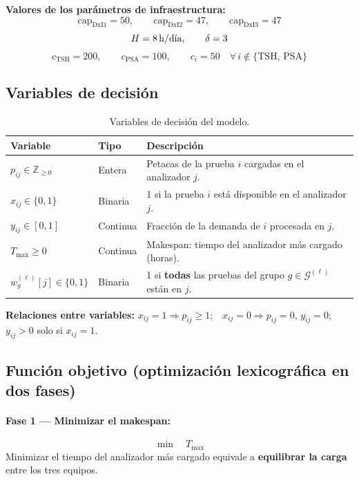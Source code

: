 \documentclass[12pt, a4paper]{article}
\begin{document}
\textbf{Valores de los parámetros de infraestructura:}
\[
  \text{cap}_{\text{DxI1}} = 50, \qquad
  \text{cap}_{\text{DxI2}} = 47, \qquad
  \text{cap}_{\text{DxI3}} = 47
\]
\[
  H = 8\text{\,h/día}, \qquad \delta = 3
\]
\[
  c_{\text{TSH}} = 200, \qquad c_{\text{PSA}} = 100, \qquad
  c_i = 50 \quad \forall\, i \notin \{\text{TSH},\,\text{PSA}\}
\]

\subsection{Variables de decisión}

\begin{table}[H]
\centering
\caption{Variables de decisión del modelo.}
\begin{tabularx}{\linewidth}{llX}
\toprule
\textbf{Variable} & \textbf{Tipo} & \textbf{Descripción} \\
\midrule
$p_{ij} \in \mathbb{Z}_{\geq 0}$ & Entera & Petacas de la prueba $i$ cargadas en el analizador $j$. \\
$x_{ij} \in \{0,1\}$ & Binaria & 1 si la prueba $i$ está disponible en el analizador $j$. \\
$y_{ij} \in [0,1]$ & Continua & Fracción de la demanda de $i$ procesada en $j$. \\
$T_{\max} \geq 0$ & Continua & Makespan: tiempo del analizador más cargado (horas). \\
$w_g^{(\ell)}[j] \in \{0,1\}$ & Binaria & 1 si \textbf{todas} las pruebas del grupo $g \in \mathcal{G}^{(\ell)}$ están en $j$. \\
\bottomrule
\end{tabularx}
\end{table}

\textbf{Relaciones entre variables:}
$x_{ij} = 1 \Rightarrow p_{ij} \geq 1$;\ \
$x_{ij} = 0 \Rightarrow p_{ij} = 0,\, y_{ij} = 0$;\ \
$y_{ij} > 0$ solo si $x_{ij} = 1$.

\subsection{Función objetivo (optimización lexicográfica en dos fases)}

\paragraph{Fase 1 — Minimizar el makespan:}
\[
  \min \quad T_{\max}
\]
Minimizar el tiempo del analizador más cargado equivale a \textbf{equilibrar la carga}
entre los tres equipos.
\end{document}
